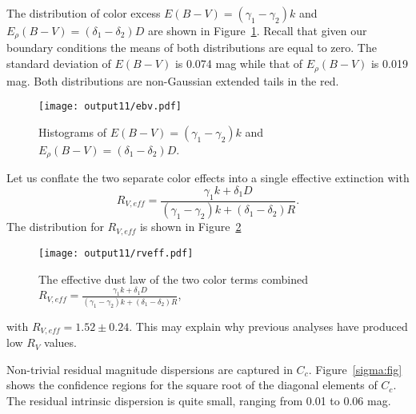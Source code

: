 \documentclass[11pt, oneside]{article}   	%
\begin{document}
The distribution of color excess $E(B-V) =(\gamma_1-\gamma_2)k$ and
 $E_\rho(B-V) = (\delta_1-\delta_2)D$ are shown in Figure~\ref{ebv:fig}.
Recall that given our boundary conditions the means of both distributions are equal to zero. 
The standard deviation of $E(B-V)$ is 0.074 mag while that of $E_\rho(B-V)$ is 0.019 mag.
Both distributions are non-Gaussian extended tails in the red.
\begin{figure}[htbp] %
   \centering
   \texttt{[image: output11/ebv.pdf]}
   \caption{Histograms of $E(B-V) =(\gamma_1-\gamma_2)k$ and
   $E_\rho(B-V) = (\delta_1-\delta_2)D$.
   \label{ebv:fig}}
\end{figure}

Let us conflate the two separate color effects into a single effective extinction with
\begin{equation}
R_{V,eff}  = \frac{\gamma_1 k + \delta_1 D}{(\gamma_1-\gamma_2) k + (\delta_1-\delta_2)R}.
\end{equation}
The distribution for $R_{V,eff}$ is shown in Figure~\ref{rveff:fig}
\begin{figure}[htbp] %
   \centering
   \texttt{[image: output11/rveff.pdf]}
   \caption{The effective dust law of the two color terms combined $R_{V,eff}  = \frac{\gamma_1 k + \delta_1 D}{(\gamma_1-\gamma_2) k + (\delta_1-\delta_2)R}$,
   \label{rveff:fig}}
\end{figure}
with  $R_{V,eff}  = 1.52 \pm 0.24$.  This may explain why previous analyses have produced low $R_V$ values.

Non-trivial residual magnitude dispersions are captured in $C_c$.   Figure~\ref{sigma:fig} shows the confidence regions for the
square root of the diagonal elements of $C_c$.  The residual intrinsic dispersion is quite small, ranging from 0.01 to 0.06 mag.
\end{document}
